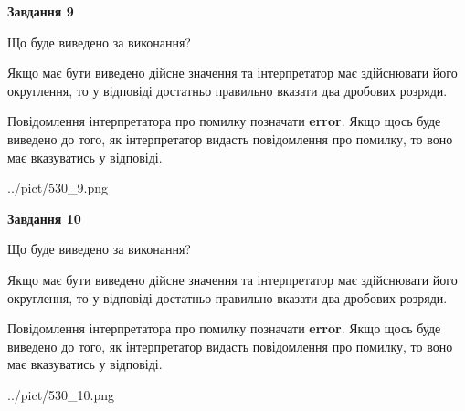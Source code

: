 \documentclass[12pt, ukrainian]{article}
\begin{document}
{\begin {Large}
{\begin {center}\textbf{Завдання 9}\end {center}}\par
Що буде виведено за виконання? \par

Якщо має бути виведено дійсне значення та інтерпретатор має здійснювати його округлення, 
то у відповіді достатньо правильно вказати два дробових розряди.

Повідомлення інтерпретатора про помилку позначати \textbf{error}.
Якщо щось буде виведено до того, як інтерпретатор видасть повідомлення про помилку, 
то воно має вказуватись у відповіді. \par

\begin{center}
	{../pict/530_9.png}
\end{center}
\newpage

{\begin {center}\textbf{Завдання 10}\end {center}}\par
Що буде виведено за виконання? \par

Якщо має бути виведено дійсне значення та інтерпретатор має здійснювати його округлення, 
то у відповіді достатньо правильно вказати два дробових розряди.

Повідомлення інтерпретатора про помилку позначати \textbf{error}.
Якщо щось буде виведено до того, як інтерпретатор видасть повідомлення про помилку, 
то воно має вказуватись у відповіді. \par

\begin{center}
	{../pict/530_10.png}
\end{center}
\newpage

\end {Large}}
\end{document}

